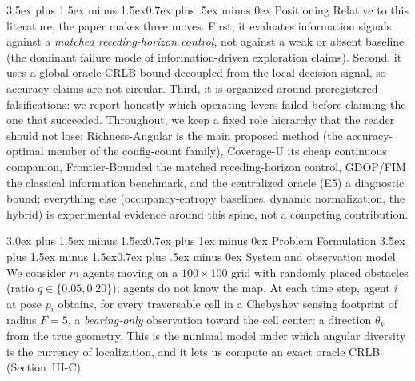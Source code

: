 \documentclass[journal]{IEEEtran}
\makeatletter
\newcommand{\CU}{Coverage-U}
\newcommand{\FB}{Frontier-Bounded}
\newcommand{\RA}{Richness-Angular}
\renewcommand{\section}{\@startsection{section}{1}{\z@}%
{3.0ex plus 1.5ex minus 1.5ex}{0.7ex plus 1ex minus 0ex}%
{\normalfont\large\bfseries\scshape\centering}}
\renewcommand{\subsection}{\@startsection{subsection}{2}{\z@}%
{3.5ex plus 1.5ex minus 1.5ex}{0.7ex plus .5ex minus 0ex}%
{\normalfont\normalsize\bfseries}}
\makeatother
\begin{document}
\subsection{Positioning}
Relative to this literature, the paper makes three moves. First, it evaluates
information signals against a \emph{matched receding-horizon control}, not
against a weak or absent baseline (the dominant failure mode of
information-driven exploration claims). Second, it uses a global oracle CRLB
bound decoupled from the local decision signal, so accuracy claims are not
circular. Third, it is organized around preregistered falsifications: we
report honestly which operating levers failed before claiming the one that
succeeded. Throughout, we keep a fixed role hierarchy that the reader should
not lose: \RA{} is the main proposed method (the accuracy-optimal member of
the config-count family), \CU{} its cheap continuous companion, \FB{} the
matched receding-horizon control, GDOP/FIM the classical information
benchmark, and the centralized oracle (E5) a diagnostic bound; everything
else (occupancy-entropy baselines, dynamic normalization, the hybrid) is
experimental evidence around this spine, not a competing contribution.


\section{Problem Formulation}
\subsection{System and observation model}
We consider $m$ agents moving on a $100 \times 100$ grid with randomly placed
obstacles (ratio $q \in \{0.05, 0.20\}$); agents do not know the map. At each
time step, agent $i$ at pose $p_i$ obtains, for every traversable cell in a
Chebyshev sensing footprint of radius $F = 5$, a \emph{bearing-only}
observation toward the cell center: a direction $\theta_k$ from the true
geometry. This is the minimal model under which angular diversity is the
currency of localization, and it lets us compute an exact oracle CRLB
(Section~III-C).
\end{document}
